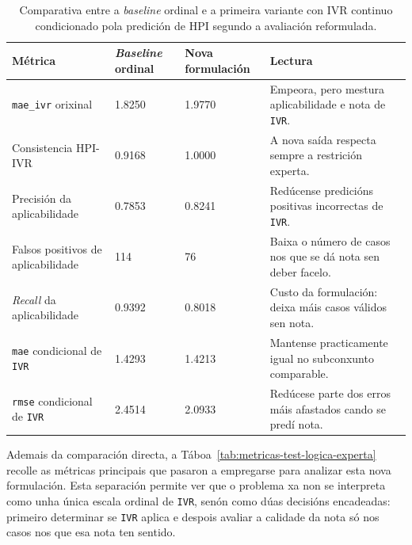 {
\begin{table}[htbp]
    \centering
    \footnotesize
    \setlength{\tabcolsep}{4pt}
    \begin{tabular}{p{}|p{}|p{}|p{}}
        \rowcolor{udcpink!25}
        \textbf{Métrica} & \textbf{\textit{Baseline} ordinal} & \textbf{Nova formulación} & \textbf{Lectura} \\\hline
        \texttt{mae\_ivr} orixinal & 1.8250 & 1.9770 & Empeora, pero mestura aplicabilidade e nota de \texttt{IVR}. \\
        Consistencia HPI-IVR & 0.9168 & 1.0000 & A nova saída respecta sempre a restrición experta. \\
        Precisión da aplicabilidade & 0.7853 & 0.8241 & Redúcense predicións positivas incorrectas de \texttt{IVR}. \\
        Falsos positivos de aplicabilidade & 114 & 76 & Baixa o número de casos nos que se dá nota sen deber facelo. \\
        \textit{Recall} da aplicabilidade & 0.9392 & 0.8018 & Custo da formulación: deixa máis casos válidos sen nota. \\
        \texttt{mae} condicional de \texttt{IVR} & 1.4293 & 1.4213 & Mantense practicamente igual no subconxunto comparable. \\
        \texttt{rmse} condicional de \texttt{IVR} & 2.4514 & 2.0933 & Redúcese parte dos erros máis afastados cando se predí nota. \\
    \end{tabular}
    \caption{Comparativa entre a \textit{baseline} ordinal e a primeira variante con IVR continuo condicionado pola predición de HPI segundo a avaliación reformulada.}
    \label{tab:comparativa-logica-experta}
\end{table}
}

Ademais da comparación directa, a Táboa~\ref{tab:metricas-test-logica-experta} recolle as métricas
principais que pasaron a empregarse para analizar esta nova formulación. Esta separación permite ver
que o problema xa non se interpreta como unha única escala ordinal de \texttt{IVR}, senón como dúas
decisións encadeadas: primeiro determinar se \texttt{IVR} aplica e despois avaliar a calidade da nota
só nos casos nos que esa nota ten sentido.

